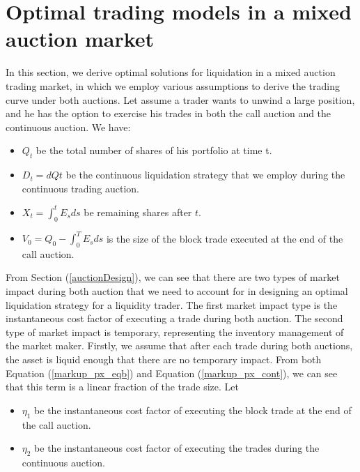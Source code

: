 \documentclass{article}
\begin{document}
\section{Optimal trading models in a mixed auction market}\label{secModel}

In this section, we derive optimal solutions for liquidation in a mixed auction trading market, in which we employ various assumptions to derive the trading curve under both auctions. Let assume a trader wants to unwind a large position, and he has the option to exercise his trades in both the call auction and the continuous auction. We have:

\begin{itemize}
\item $Q_t$ be the total number of shares of his portfolio at time t.
\item $D_t=dQt$ be the continuous liquidation strategy that we employ during the continuous trading auction.
\item $X_t=\int_0^t E_s ds$ be remaining shares after $t$.
\item $V_0=Q_0 - \int_0^T E_s ds$ is the size of the block trade executed at the end of the call auction.
\end{itemize}

From Section (\ref{auctionDesign}), we can see that there are two types of market impact during both auction that we need to account for in designing an optimal liquidation strategy for a liquidity trader. The first market impact type is the instantaneous cost factor of executing a trade during both auction. The second type of market impact is temporary, representing the inventory management of the market maker. Firstly, we assume that after each trade during both auctions, the asset is liquid enough that there are no temporary impact. From both Equation (\ref{markup_px_eqb}) and Equation (\ref{markup_px_cont}), we can see that this term is a linear fraction of the trade size. Let
\begin{itemize}
\item $\eta_1$ be the instantaneous cost factor of executing the block trade at the end of the call auction.
\item $\eta_2$ be the instantaneous cost factor of executing the trades during the continuous auction.
\end{itemize}
\end{document}
